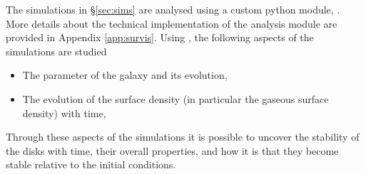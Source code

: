 The simulations in \S\ref{sec:sims} are analysed using a custom python module, \sv. 
More details about the technical implementation of the analysis module are provided in Appendix \ref{app:survis}.
Using \sv, the following aspects of the simulations are studied
\begin{itemize}
\item The \citet{toomre_gravitational_1964} parameter of the galaxy and its evolution,
\item The evolution of the surface density (in particular the gaseous surface density) with time,
\end{itemize}
Through these aspects of the simulations it is possible to uncover the stability of the disks with time, their overall properties, and how it is that they become stable relative to the initial conditions.
